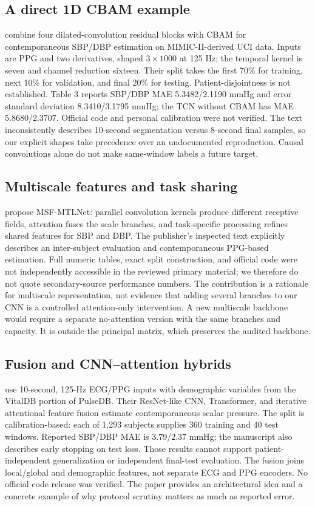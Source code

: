 \documentclass[11pt]{article}
\begin{document}
\subsection{A direct 1D CBAM example}
\citet{dai2024tcn} combine four dilated-convolution residual blocks with CBAM for contemporaneous SBP/DBP estimation on MIMIC-II-derived UCI data. Inputs are PPG and two derivatives, shaped $3\times1000$ at 125 Hz; the temporal kernel is seven and channel reduction sixteen. Their split takes the first 70\% for training, next 10\% for validation, and final 20\% for testing. Patient-disjointness is not established. Table 3 reports SBP/DBP MAE 5.3482/2.1190 mmHg and error standard deviation 8.3410/3.1795 mmHg; the TCN without CBAM has MAE 5.8680/2.3707. Official code and personal calibration were not verified. The text inconsistently describes 10-second segmentation versus 8-second final samples, so our explicit shapes take precedence over an undocumented reproduction. Causal convolutions alone do not make same-window labels a future target.

\subsection{Multiscale features and task sharing}
\citet{hu2022multiscale} propose MSF-MTLNet: parallel convolution kernels produce different receptive fields, attention fuses the scale branches, and task-specific processing refines shared features for SBP and DBP. The publisher's inspected text explicitly describes an inter-subject evaluation and contemporaneous PPG-based estimation. Full numeric tables, exact split construction, and official code were not independently accessible in the reviewed primary material; we therefore do not quote secondary-source performance numbers. The contribution is a rationale for multiscale representation, not evidence that adding several branches to our CNN is a controlled attention-only intervention. A new multiscale backbone would require a separate no-attention version with the same branches and capacity. It is outside the principal matrix, which preserves the audited backbone.

\subsection{Fusion and CNN--attention hybrids}
\citet{tang2025aff} use 10-second, 125-Hz ECG/PPG inputs with demographic variables from the VitalDB portion of PulseDB. Their ResNet-like CNN, Transformer, and iterative attentional feature fusion estimate contemporaneous scalar pressure. The split is calibration-based: each of 1,293 subjects supplies 360 training and 40 test windows. Reported SBP/DBP MAE is 3.79/2.37 mmHg; the manuscript also describes early stopping on test loss. Those results cannot support patient-independent generalization or independent final-test evaluation. The fusion joins local/global and demographic features, not separate ECG and PPG encoders. No official code release was verified. The paper provides an architectural idea and a concrete example of why protocol scrutiny matters as much as reported error.
\end{document}
